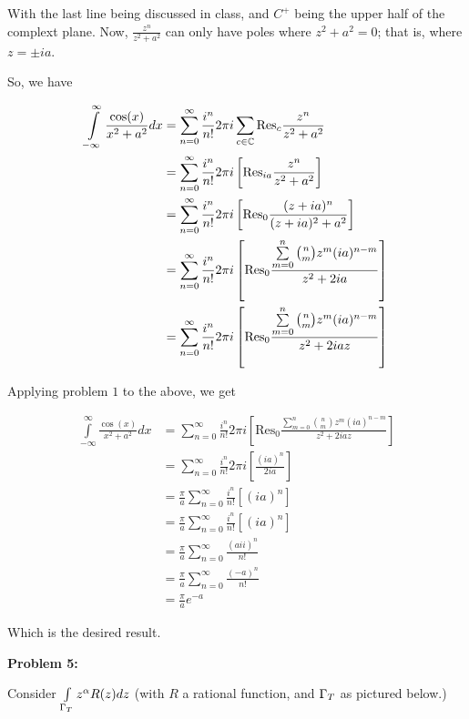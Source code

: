 \documentclass[a4paper,12pt]{article}
\begin{document}
With the last line being discussed in class, and $C^+$ being the upper half of the complext plane. Now, $\frac{z^n}{z^2 + a^2}$ can only have poles where $z^2 + a^2 = 0$; that is, where $z= \pm i a$.

So, we have 

\begin{align*}
\int\limits_{-\infty}^\infty \frac{\cos(x)}{x^2+a^2} dx &= \sum\limits_{n=0}^\infty \frac{i^n}{n!} 2\pi i \sum\limits_{c \in \mathbb{C}} \text{Res}_c \frac{z^n}{z^2+a^2}\\
&= \sum\limits_{n=0}^\infty \frac{i^n}{n!} 2\pi i \left[ \text{Res}_{ia} \frac{z^n}{z^2+a^2}\right]\\
&= \sum\limits_{n=0}^\infty \frac{i^n}{n!} 2\pi i \left[ \text{Res}_0 \frac{(z+ia)^n}{(z+ia)^2+a^2} \right]\\
&= \sum\limits_{n=0}^\infty \frac{i^n}{n!} 2\pi i \left[ \text{Res}_0 \frac{\sum\limits_{m=0}^n \binom{n}{m} z^m (ia)^{n-m}}{z^2 + 2ia} \right]\\
&= \sum\limits_{n=0}^\infty \frac{i^n}{n!} 2\pi i \left[ \text{Res}_0 \frac{\sum\limits_{m=0}^n \binom{n}{m} z^m (ia)^{n-m}}{z^2 + 2iaz} \right]\\
\end{align*}

Applying problem $1$ to the above, we get

\begin{align*}
\int\limits_{-\infty}^\infty \frac{\cos(x)}{x^2+a^2} dx &=\sum\limits_{n=0}^\infty \frac{i^n}{n!} 2\pi i \left[ \text{Res}_0 \frac{\sum\limits_{m=0}^n \binom{n}{m} z^m (ia)^{n-m}}{z^2 + 2iaz} \right]\\
&= \sum\limits_{n=0}^\infty \frac{i^n}{n!} 2\pi i \left[ \frac{ (ia)^{n}}{2ia} \right]\\
&= \frac{\pi}{a} \sum\limits_{n=0}^\infty \frac{i^n}{n!}  \left[ (ia)^{n}\right]\\
&= \frac{\pi}{a} \sum\limits_{n=0}^\infty \frac{i^n}{n!}  \left[(ia)^{n} \right]\\
&= \frac{\pi}{a} \sum\limits_{n=0}^\infty \frac{(aii)^n}{n!} \\
&= \frac{\pi}{a} \sum\limits_{n=0}^\infty \frac{(-a)^n}{n!}\\
&= \frac{\pi}{a} e^{-a}
\end{align*}

Which is the desired result.

\shunt

{\bf Problem 5:}

Consider $\int\limits_{\Gamma_T} z^\alpha R(z) dz$ (with $R$ a rational function, and $\Gamma_T$ as pictured below.)
\end{document}
